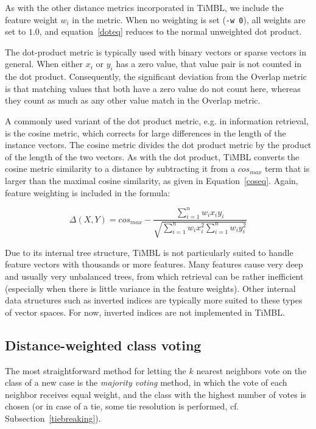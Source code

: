 \documentclass{book}
\begin{document}
As with the other distance metrics incorporated in TiMBL, we include
the feature weight $w_{i}$ in the metric. When no weighting is set
({\tt -w 0}), all weights are set to $1.0$, and equation~\ref{doteq}
reduces to the normal unweighted dot product.

The dot-product metric is typically used with binary vectors or sparse
vectors in general. When either $x_{i}$ or $y_{i}$ has a zero value, that
value pair is not counted in the dot product. Consequently, the significant
deviation from the Overlap metric is that matching values that both have a
zero value do not count here, whereas they count as much as any other value
match in the Overlap metric.

A commonly used variant of the dot product metric, e.g. in information
retrieval, is the cosine metric, which corrects for large differences
in the length of the instance vectors. The cosine metric divides the
dot product metric by the product of the length of the two vectors. As
with the dot product, TiMBL converts the cosine metric similarity to a
distance by subtracting it from a $cos_{max}$ term that is larger than
the maximal cosine similarity, as given in
Equation~\ref{coseq}. Again, feature weighting is included in the
formula:

\begin{equation}
\label{coseq}
\Delta(X,Y) = cos_{max} - \frac{\sum_{i=1}^{n} w_{i} x_{i} y_{i}}{\sqrt{\sum_{i=1}^{n} w_{i} x_{i}^2 \sum_{i=1}^{n} w_{i} y_{i}^2}}
\end{equation}

Due to its internal tree structure, TiMBL is not particularly suited
to handle feature vectors with thousands or more features. Many features
cause very deep and usually very unbalanced trees, from which
retrieval can be rather inefficient (especially when there is little
variance in the feature weights). Other internal data structures such as
inverted indices are typically more suited to these types of vector
spaces. For now, inverted indices are not implemented in TiMBL.

\subsection{Distance-weighted class voting}
\label{distweightvote}

The most straightforward method for letting the $k$ nearest neighbors
vote on the class of a new case is the {\em majority voting} method,
in which the vote of each neighbor receives equal weight, and the
class with the highest number of votes is chosen (or in case of a tie,
some tie resolution is performed, cf. Subsection~\ref{tiebreaking}).
\end{document}
